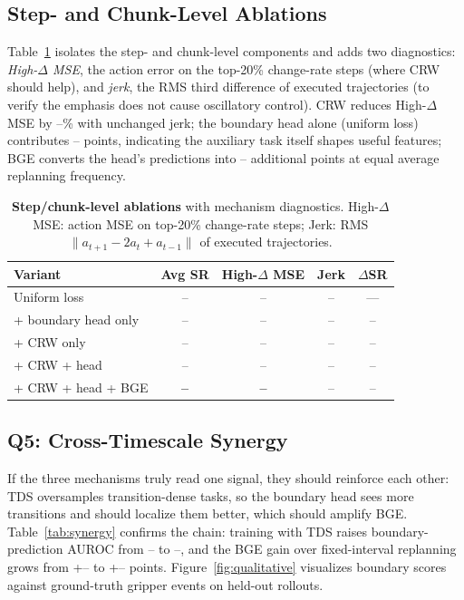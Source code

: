 \documentclass[letterpaper]{article} %
\newcommand{\crw}{CRW}    %
\newcommand{\bge}{BGE}    %
\newcommand{\tds}{TDS}    %
\newcommand{\na}{--}      %
\begin{document}
\subsection{Step- and Chunk-Level Ablations}
Table~\ref{tab:step_ablation} isolates the step- and chunk-level components and adds two diagnostics: \emph{High-$\Delta$ MSE}, the action error on the top-20\% change-rate steps (where \crw{} should help), and \emph{jerk}, the RMS third difference of executed trajectories (to verify the emphasis does not cause oscillatory control). \crw{} reduces High-$\Delta$ MSE by \na{}\% with unchanged jerk; the boundary head alone (uniform loss) contributes \na{} points, indicating the auxiliary task itself shapes useful features; \bge{} converts the head's predictions into \na{} additional points at equal average replanning frequency.

\begin{table}[t]
\centering
\setlength{\tabcolsep}{1mm}
\begin{tabular}{lcccc}
\toprule
Variant & Avg SR & High-$\Delta$ MSE & Jerk & $\Delta$SR \\
\midrule
Uniform loss            & \na{} & \na{} & \na{} & --- \\
+ boundary head only    & \na{} & \na{} & \na{} & \na{} \\
+ \crw{} only           & \na{} & \na{} & \na{} & \na{} \\
+ \crw{} + head         & \na{} & \na{} & \na{} & \na{} \\
+ \crw{} + head + \bge{} & \textbf{\na{}} & \textbf{\na{}} & \na{} & \na{} \\
\bottomrule
\end{tabular}
\caption{\textbf{Step/chunk-level ablations} with mechanism diagnostics. High-$\Delta$ MSE: action MSE on top-20\% change-rate steps; Jerk: RMS $\|a_{t+1}-2a_t+a_{t-1}\|$ of executed trajectories. %
}
\label{tab:step_ablation}
\end{table}

\subsection{Q5: Cross-Timescale Synergy}
If the three mechanisms truly read one signal, they should reinforce each other: \tds{} oversamples transition-dense tasks, so the boundary head sees more transitions and should localize them better, which should amplify \bge{}. Table~\ref{tab:synergy} confirms the chain: training with \tds{} raises boundary-prediction AUROC from \na{} to \na{}, and the \bge{} gain over fixed-interval replanning grows from +\na{} to +\na{} points. Figure~\ref{fig:qualitative} visualizes boundary scores against ground-truth gripper events on held-out rollouts.
\end{document}

